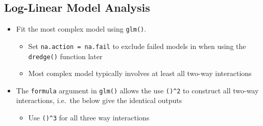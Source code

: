 \documentclass[
]{book}
\newenvironment{Shaded}{\begin{snugshade}}{\end{snugshade}}
\newcommand{\AttributeTok}[1]{\textcolor[rgb]{0.77,0.63,0.00}{#1}}
\newcommand{\CommentTok}[1]{\textcolor[rgb]{0.56,0.35,0.01}{\textit{#1}}}
\newcommand{\DecValTok}[1]{\textcolor[rgb]{0.00,0.00,0.81}{#1}}
\newcommand{\FunctionTok}[1]{\textcolor[rgb]{0.00,0.00,0.00}{#1}}
\newcommand{\NormalTok}[1]{#1}
\newcommand{\OtherTok}[1]{\textcolor[rgb]{0.56,0.35,0.01}{#1}}
\newcommand{\SpecialCharTok}[1]{\textcolor[rgb]{0.00,0.00,0.00}{#1}}
\newcommand{\StringTok}[1]{\textcolor[rgb]{0.31,0.60,0.02}{#1}}
\providecommand{\tightlist}{%
  \setlength{\itemsep}{0pt}\setlength{\parskip}{0pt}}
\begin{document}
\hypertarget{log-linear-model-analysis-2}{%
\subsection{Log-Linear Model Analysis}\label{log-linear-model-analysis-2}}

\begin{itemize}
\tightlist
\item
  Fit the most complex model using \texttt{glm()}.

  \begin{itemize}
  \tightlist
  \item
    Set \texttt{na.action\ =\ na.fail} to exclude failed models in when using the \texttt{dredge()} function later
  \item
    Most complex model typically involves at least all two-way interactions
  \end{itemize}
\item
  The \texttt{formula} argument in \texttt{glm()} allows the use \texttt{()\^{}2} to construct all two-way interactions, i.e.~the below give the identical outputs

  \begin{itemize}
  \tightlist
  \item
    Use \texttt{()\^{}3} for all three way interactions
  \end{itemize}
\end{itemize}

\begin{Shaded}
\end{Shaded}
\end{document}
